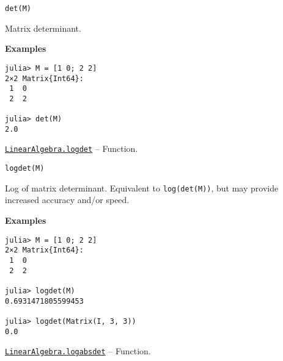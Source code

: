 \begin{adjustwidth}{2em}{0pt}


\begin{verbatim}
det(M)
\end{verbatim}

Matrix determinant.

\textbf{Examples}


\begin{verbatim}
julia> M = [1 0; 2 2]
2×2 Matrix{Int64}:
 1  0
 2  2

julia> det(M)
2.0
\end{verbatim}



\end{adjustwidth}
\hypertarget{12765142073947245963}{}
\hyperlink{12765142073947245963}{\texttt{LinearAlgebra.logdet}}  -- {Function.}

\begin{adjustwidth}{2em}{0pt}


\begin{verbatim}
logdet(M)
\end{verbatim}

Log of matrix determinant. Equivalent to \texttt{log(det(M))}, but may provide increased accuracy and/or speed.

\textbf{Examples}


\begin{verbatim}
julia> M = [1 0; 2 2]
2×2 Matrix{Int64}:
 1  0
 2  2

julia> logdet(M)
0.6931471805599453

julia> logdet(Matrix(I, 3, 3))
0.0
\end{verbatim}



\end{adjustwidth}
\hypertarget{11067048979448481853}{}
\hyperlink{11067048979448481853}{\texttt{LinearAlgebra.logabsdet}}  -- {Function.}

